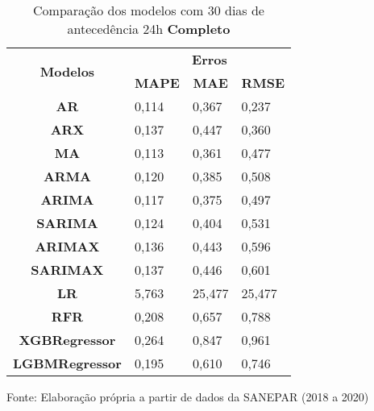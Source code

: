 \begin{table}[H]
	\centering
	\caption{Comparação dos modelos com 30 dias de antecedência 24h \textbf{Completo} }\label{tb:60-24cm}
	\begin{tabular}{@{}clll@{}}
		\toprule
		\multirow{2}{*}{\textbf{Modelos}} & \multicolumn{3}{c}{\textbf{Erros}}                                                                       \\ \cmidrule(l){2-4} 
		& \multicolumn{1}{c}{\textbf{MAPE}} & \multicolumn{1}{c}{\textbf{MAE}} & \multicolumn{1}{c}{\textbf{RMSE}} \\ \hline
\textbf{AR}                       & 0,114                             & 0,367                            & 0,237                             \\
\textbf{ARX}                      & 0,137                             & 0,447                            & 0,360                             \\
\textbf{MA}                       & 0,113                             & 0,361                            & 0,477                             \\
\textbf{ARMA}                     & 0,120                             & 0,385                            & 0,508                             \\
\textbf{ARIMA}                    & 0,117                             & 0,375                            & 0,497                             \\
\textbf{SARIMA}                   & 0,124                             & 0,404                            & 0,531                             \\
\textbf{ARIMAX}                   & 0,136                             & 0,443                            & 0,596                             \\
\textbf{SARIMAX}                  & 0,137                             & 0,446                            & 0,601                             \\
\textbf{LR}                       & 5,763                             & 25,477                           & 25,477                            \\
\textbf{RFR}                      & 0,208                             & 0,657                            & 0,788                             \\
\textbf{XGBRegressor}             & 0,264                             & 0,847                            & 0,961                             \\
\textbf{LGBMRegressor}            & 0,195                             & 0,610                            & 0,746                             \\ \bottomrule
	\end{tabular}

Fonte: Elaboração própria a partir de dados da SANEPAR (2018 a 2020)
\end{table}